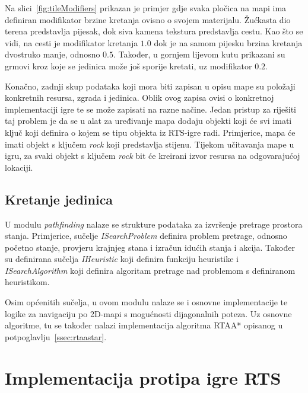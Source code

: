 \documentclass[times, utf8, zavrsni, numeric]{fer}
\begin{document}
\par Na slici~\ref{fig:tileModifiers} prikazan je primjer gdje svaka pločica na mapi ima definiran modifikator brzine kretanja ovisno o svojem materijalu.
Žućkasta dio terena predstavlja pijesak, dok siva kamena tekstura predstavlja cestu.
Kao što se vidi, na cesti je modifikator kretanja \(1.0\) dok je na samom pijesku brzina kretanja dvostruko manje, odnosno \(0.5\).
Također, u gornjem lijevom kutu prikazani su grmovi kroz koje se jedinica može još sporije kretati, uz modifikator \(0.2\).

\par Konačno, zadnji skup podataka koji mora biti zapisan u opisu mape su položaji konkretnih resursa, zgrada i jedinica.
Oblik ovog zapisa ovisi o konkretnoj implementaciji igre te se može zapisati na razne načine.
Jedan pristup za riješiti taj problem je da se u alat za uređivanje mapa dodaju objekti koji će svi imati ključ koji definira o kojem se tipu objekta  iz RTS-igre radi.
Primjerice, mapa će imati objekt s ključem \textit{rock} koji predstavlja stijenu.
Tijekom učitavanja mape u igru, za svaki objekt s ključem \textit{rock} bit će kreirani izvor resursa na odgovarajućoj lokaciji.

\subsection{Kretanje jedinica}

\par U modulu \textit{pathfinding} nalaze se strukture podataka za izvršenje pretrage prostora stanja.
Primjerice, sučelje \textit{ISearchProblem} definira problem pretrage, odnosno početno stanje, provjeru krajnjeg stana i izračun idućih stanja i akcija. 
Također su definirana sučelja \textit{IHeuristic} koji definira funkciju heuristike i \textit{ISearchAlgorithm} koji definira algoritam pretrage nad problemom s definiranom heuristikom.

\par Osim općenitih sučelja, u ovom modulu nalaze se i osnovne implementacije te logike za navigaciju po 2D-mapi s mogućnosti dijagonalnih poteza.
Uz osnovne algoritme, tu se također nalazi implementacija algoritma RTAA* opisanog u potpoglavlju~\ref{ssec:rtaastar}.

\section{Implementacija protipa igre RTS}
\end{document}
